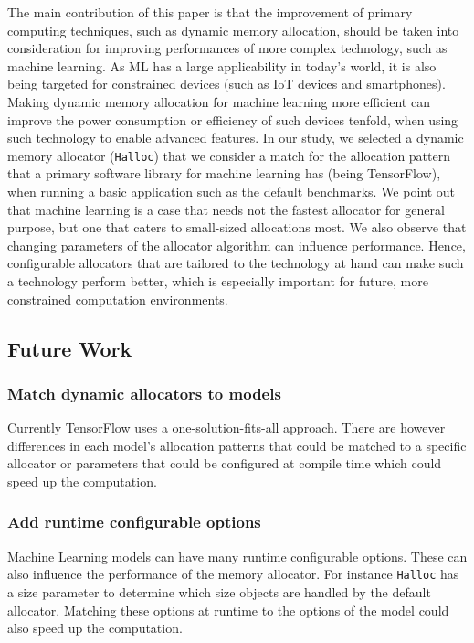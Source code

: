 \documentclass[12pt,twoside]{article}
\begin{document}
The main contribution of this paper is that the improvement of primary computing techniques, such as dynamic memory allocation, should be taken into consideration for improving performances of more complex technology, such as machine learning. As ML has a large applicability in today's world, it is also being targeted for constrained devices (such as IoT devices and smartphones). Making dynamic memory allocation for machine learning more efficient can improve the power consumption or efficiency of such devices tenfold, when using such technology to enable advanced features. In our study, we selected a dynamic memory allocator (\texttt{Halloc}) that we consider a match for the allocation pattern that a primary software library for machine learning has (being TensorFlow), when running a basic application such as the default benchmarks. We point out that machine learning is a case that needs not the fastest allocator for general purpose, but one that caters to small-sized allocations most. We also observe that changing parameters of the allocator algorithm can influence performance. Hence, configurable allocators that are tailored to the technology at hand can make such a technology perform better, which is especially important for future, more constrained computation environments.


\subsection{Future Work}

\subsubsection*{Match dynamic allocators to models}
Currently TensorFlow uses a one-solution-fits-all approach. There are however differences in each model's allocation patterns that could be matched to a specific allocator or parameters that could be configured at compile time which could speed up the computation.

\subsubsection*{Add runtime configurable options}
Machine Learning models can have many runtime configurable options. These can also influence the performance of the memory allocator. For instance \texttt{Halloc} has a size parameter to determine which size objects are handled by the default allocator. Matching these options at runtime to the options of the model could also speed up the computation.
\end{document}
